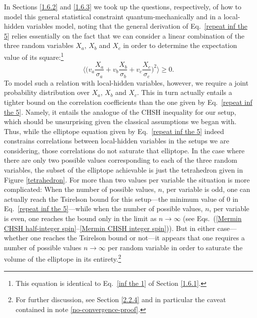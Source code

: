 In Sections \ref{1.6.2} and \ref{1.6.3} we took up the questions, respectively, of how to model this general statistical constraint quantum-mechanically and in a local-hidden variables model, noting that the general derivation of Eq.\ \eqref{repeat inf the 5} relies essentially on the fact that we can consider a linear combination of the three random variables $X_a$, $X_b$ and $X_c$ in order to determine the expectation value of its square:\footnote{This equation is identical to Eq.\ \eqref{inf the 1} of Section \ref{1.6.1}.}
\begin{equation}
\Big\langle \Big( v_a \frac{X_a}{\sigma_a} + v_b \frac{X_b}{\sigma_b} + v_c \frac{X_c}{\sigma_c} \Big)^{\!2} \Big\rangle \ge 0.
\label{repeat inf the 1}
\end{equation}
To model such a relation with local-hidden variables, however, we require a joint probability distribution over $X_a$, $X_b$ and $X_c$. This in turn actually entails a tighter bound on the correlation coefficients than the one given by Eq.\ \eqref{repeat inf the 5}. Namely, it entails the analogue of the CHSH inequality for our setup, which should be unsurprising given the classical assumptions we began with. Thus, while the elliptope equation given by Eq.\ \eqref{repeat inf the 5} indeed constrains correlations between local-hidden variables in the setups we are considering, those correlations do not saturate that elliptope. In the case where there are only two possible values corresponding to each of the three random variables, the subset of the elliptope achievable is just the tetrahedron given in Figure \ref{tetrahedron}. For more than two values per variable the situation is more complicated: When the number of possible values, $n$, per variable is odd, one can actually reach the Tsirelson bound for this setup---the minimum value of 0 in Eq.\ \eqref{repeat inf the 5}---while when the number of possible values, $n$, per variable is even, one reaches the bound only in the limit as $n \to \infty$ (see Eqs.\ (\ref{Mermin CHSH half-integer spin}--\ref{Mermin CHSH integer spin})). But in either case---whether one reaches the Tsirelson bound or not---it appears that one requires a number of possible values $n \to \infty$ per random variable in order to saturate the volume of the elliptope in its entirety.\footnote{For further discussion, see Section \ref{2.2.4} and in particular the caveat contained in note \ref{no-convergence-proof}.}

